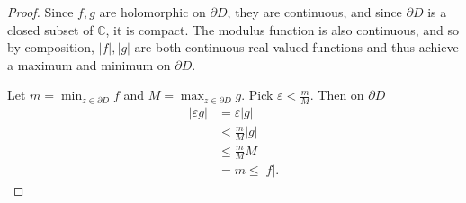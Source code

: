 \documentclass{article}
\renewcommand{\epsilon}{\varepsilon}
\begin{document}
\begin{enumerate}
\begin{proof}
		Since $f,g$ are holomorphic on $\partial D$, they are continuous, and since $\partial D$ is a closed subset of $\mathbb{C}$, it is compact.
		The modulus function is also continuous, and so by composition,		
		$|f|,|g|$ are both continuous real-valued functions and thus achieve a maximum and minimum on $\partial D$.
		
		Let $m = \min_{z \in \partial D} f$ and $M = \max_{z \in \partial D} g$. Pick $\epsilon < \frac{m}{M}$. Then on $\partial D$ 
		\begin{align*}
			| \epsilon g | &= \epsilon |g|\\
			& < \frac{m}{M} |g|\\
			& \leq \frac{m}{M}M\\
			&= m \leq |f|.
		\end{align*}
	\end{proof}

%	
	
\end{enumerate}
\end{document}
